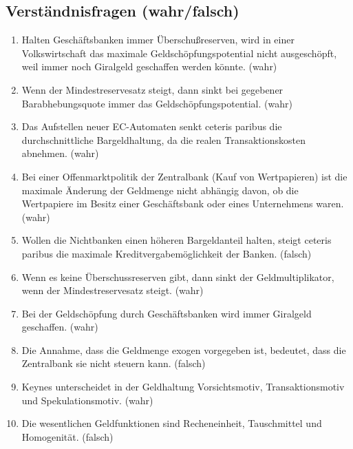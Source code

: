 \documentclass{scrartcl}
\begin{document}
\subsection{Verständnisfragen (wahr/falsch)}
\begin{enumerate}
	\item Halten Geschäftsbanken immer Überschußreserven, wird in einer Volkswirtschaft das maximale Geldschöpfungspotential nicht ausgeschöpft, weil immer noch Giralgeld geschaffen werden könnte. (wahr)
	\item Wenn der Mindestreservesatz steigt, dann sinkt bei gegebener Barabhebungsquote immer das Geldschöpfungspotential. (wahr)
	\item Das Aufstellen neuer EC-Automaten senkt ceteris paribus die durchschnittliche Bargeldhaltung, da die realen Transaktionskosten abnehmen. (wahr)
	\item Bei einer Offenmarktpolitik der Zentralbank (Kauf von Wertpapieren) ist die maximale Änderung der Geldmenge nicht abhängig davon, ob die Wertpapiere im Besitz einer
	Geschäftsbank oder eines Unternehmens waren. (wahr)
	\item Wollen die Nichtbanken einen höheren Bargeldanteil halten, steigt ceteris paribus die maximale Kreditvergabemöglichkeit der Banken. (falsch)
	\item Wenn es keine Überschussreserven gibt, dann sinkt der Geldmultiplikator, wenn der Mindestreservesatz steigt. (wahr)
	\item Bei der Geldschöpfung durch Geschäftsbanken wird immer Giralgeld geschaffen. (wahr)
	\item Die Annahme, dass die Geldmenge exogen vorgegeben ist, bedeutet, dass die Zentralbank sie nicht steuern kann. (falsch)
	\item Keynes unterscheidet in der Geldhaltung Vorsichtsmotiv, Transaktionsmotiv und Spekulationsmotiv. (wahr)
	\item Die wesentlichen Geldfunktionen sind Recheneinheit, Tauschmittel und Homogenität. (falsch)
\end{enumerate}
\end{document}
